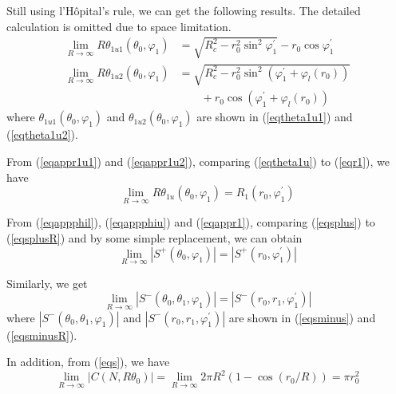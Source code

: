 \documentclass[journal, twoside]{IEEEtran}
\begin{document}
\begin{IEEEproof}
Still using l'H\^{o}pital's rule, we can get the following results. The detailed calculation is omitted due to space limitation.
\begin{align}
	 \lim_{R \to \infty} R\theta_{1u1}(\theta_0, \varphi_1)& =
	\sqrt{R_c^2 - r_0^2\sin^2 \varphi_1^\prime} - r_0 \cos \varphi_1^\prime \label{eqappr1u1} \\
	\lim_{R \to \infty} R\theta_{1u2}(\theta_0, \varphi_1) & =
	 \sqrt{R_c^2 - r_0^2\sin^2 (\varphi_1^\prime+\varphi_l(r_0))} \label{eqappr1u2} \\
	 & \qquad + r_0 \cos (\varphi_1^\prime+\varphi_l(r_0)) \nonumber
\end{align}
\noindent where $\theta_{1u1}(\theta_0, \varphi_1)$ and $\theta_{1u2}(\theta_0, \varphi_1)$ are shown in (\ref{eqtheta1u1}) and (\ref{eqtheta1u2}).

From (\ref{eqappr1u1}) and (\ref{eqappr1u2}), comparing (\ref{eqtheta1u}) to (\ref{eqr1}), we have
\begin{equation} \label{eqappr1}
	 \lim_{R \to \infty} R\theta_{1u}(\theta_0, \varphi_1) 
 =  R_1(r_0, \varphi_1^\prime)
\end{equation}

From (\ref{eqappphil}), (\ref{eqappphiu}) and (\ref{eqappr1}), comparing (\ref{eqsplus}) to (\ref{eqsplusR}) and by some simple replacement, we can obtain
\begin{equation} \label{eqappsplus}
	\lim_{R \to \infty} |S^+(\theta_0, \varphi_1)| = |S^+(r_0, \varphi_1^\prime)|
\end{equation}

Similarly, we get
\begin{equation}  \label{eqappsminus}
	\lim_{R \to \infty} |S^-(\theta_0, \theta_1, \varphi_1)| = |S^-(r_0, r_1, \varphi_1^\prime)|
\end{equation}
\noindent where $|S^-(\theta_0, \theta_1, \varphi_1)|$ and $|S^-(r_0, r_1, \varphi_1^\prime)|$
are shown in (\ref{eqsminus}) and (\ref{eqsminusR}).

In addition, from (\ref{eqs}), we have 
\begin{equation} \label{eqapps0}
	\lim_{R \to \infty} |C(N, R\theta_0)| = \lim_{R \to \infty} 2\pi R^2 (1-\cos(r_0/R)) = \pi r_0^2
\end{equation}


\end{IEEEproof}
\end{document}
